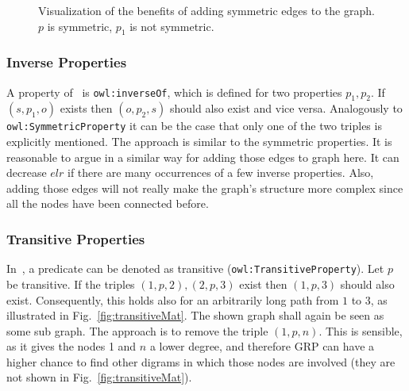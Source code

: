 \begin{figure}[h]
	\centering
	\hfill
	\caption{Visualization of the benefits of adding symmetric edges to the graph. $p$ is symmetric, $p_1$ is not symmetric.}
	\label{}
\end{figure}

\subsubsection{Inverse Properties}

A property of~\cite{owl} is {\tt owl:inverseOf}, which is defined for two properties $p_1, p_2$. If $(s,p_1,o)$ exists then $(o,p_2,s)$ should also exist and vice versa. Analogously to {\tt owl:SymmetricProperty} it can be the case that only one of the two triples is explicitly mentioned. The approach is similar to the symmetric properties. It is reasonable to argue in a similar way for adding those edges to graph here. It can decrease $elr$ if there are many occurrences of a few inverse properties. Also, adding those edges will not really make the graph's structure more complex since all the nodes have been connected before.


\subsubsection{Transitive Properties}

In~\cite{owl}, a predicate can be denoted as transitive ({\tt owl:TransitiveProperty}). Let $p$ be transitive. If the triples $(1,p,2),(2,p,3)$ exist then $(1,p,3)$ should also exist. Consequently, this holds also for an arbitrarily long path from $1$ to $3$, as illustrated in Fig.~\ref{fig:transitiveMat}. The shown graph shall again be seen as some sub graph. The approach is to remove the triple $(1,p,n)$. This is sensible, as it gives the nodes 1 and $n$ a lower degree, and therefore GRP can have a higher chance to find other digrams in which those nodes are involved (they are not shown in Fig.~\ref{fig:transitiveMat}).

